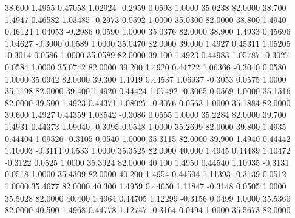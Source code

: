   38.600   1.4955   0.47058   1.02924  -0.2959   0.0593   1.0000  35.0238  82.0000
  38.700   1.4947   0.46582   1.03485  -0.2973   0.0592   1.0000  35.0300  82.0000
  38.800   1.4940   0.46124   1.04053  -0.2986   0.0590   1.0000  35.0376  82.0000
  38.900   1.4933   0.45696   1.04627  -0.3000   0.0589   1.0000  35.0470  82.0000
  39.000   1.4927   0.45311   1.05205  -0.3014   0.0586   1.0000  35.0589  82.0000
  39.100   1.4923   0.44983   1.05787  -0.3027   0.0584   1.0000  35.0742  82.0000
  39.200   1.4920   0.44722   1.06366  -0.3040   0.0580   1.0000  35.0942  82.0000
  39.300   1.4919   0.44537   1.06937  -0.3053   0.0575   1.0000  35.1198  82.0000
  39.400   1.4920   0.44424   1.07492  -0.3065   0.0569   1.0000  35.1516  82.0000
  39.500   1.4923   0.44371   1.08027  -0.3076   0.0563   1.0000  35.1884  82.0000
  39.600   1.4927   0.44359   1.08542  -0.3086   0.0555   1.0000  35.2284  82.0000
  39.700   1.4931   0.44373   1.09040  -0.3095   0.0548   1.0000  35.2699  82.0000
  39.800   1.4935   0.44404   1.09526  -0.3105   0.0540   1.0000  35.3115  82.0000
  39.900   1.4940   0.44442   1.10003  -0.3114   0.0533   1.0000  35.3525  82.0000
  40.000   1.4945   0.44489   1.10472  -0.3122   0.0525   1.0000  35.3924  82.0000
  40.100   1.4950   0.44540   1.10935  -0.3131   0.0518   1.0000  35.4309  82.0000
  40.200   1.4954   0.44594   1.11393  -0.3139   0.0512   1.0000  35.4677  82.0000
  40.300   1.4959   0.44650   1.11847  -0.3148   0.0505   1.0000  35.5028  82.0000
  40.400   1.4964   0.44705   1.12299  -0.3156   0.0499   1.0000  35.5360  82.0000
  40.500   1.4968   0.44778   1.12747  -0.3164   0.0494   1.0000  35.5673  82.0000

